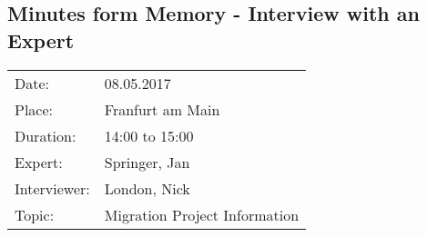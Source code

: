 \subsection*{Minutes form Memory  - Interview with an Expert}
\begin{tabular}{l l}
Date: & 08.05.2017 \\
Place: & Franfurt am Main \\
Duration: & 14:00 to 15:00 \\
Expert: & Springer, Jan \\
Interviewer: & London, Nick \\
Topic: & Migration Project Information
\end{tabular}

\paragraph{}
